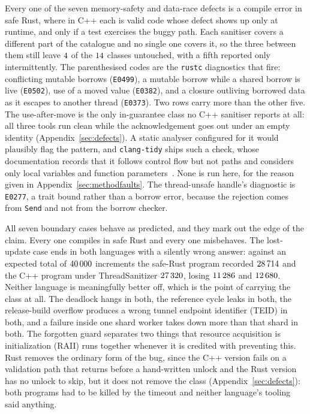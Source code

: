 \documentclass[english,oneside,a4paper,censored,csm,software-track-2020]{HYthesisML}
\begin{document}
Every one of the seven memory-safety and data-race defects is a compile error in safe Rust, where
in C++ each is valid code whose defect shows up only at runtime, and only if a test exercises the
buggy path. Each sanitiser covers a different part of the catalogue and no single one covers it,
so the three between them still leave $4$ of the $14$ classes
untouched, with a fifth reported only intermittently. The parenthesised codes are the
\texttt{rustc} diagnostics that fire: conflicting mutable borrows (\texttt{E0499}), a mutable
borrow while a shared borrow is live (\texttt{E0502}), use of a moved value (\texttt{E0382}), and
a closure outliving borrowed data as it escapes to another thread (\texttt{E0373}). Two rows carry
more than the other five. The use-after-move is the only in-guarantee class no C++ sanitiser
reports at all: all three tools run clean while the acknowledgement goes out under an empty
identity (Appendix~\ref{sec:defects}). A static analyser configured for it would plausibly flag the
pattern, and \texttt{clang-tidy} ships such a check, whose documentation records that it follows
control flow but not paths and considers only local variables and function
parameters~\cite{clangtidyuseaftermove}. None is run here, for the reason given in
Appendix~\ref{sec:methodfaults}. The thread-unsafe handle's diagnostic is \texttt{E0277}, a trait
bound rather than a borrow error, because the rejection comes from \texttt{Send} and not from the
borrow checker.

All seven boundary cases behave as predicted, and they mark out the edge of the claim. Every one
compiles in safe Rust and every one misbehaves. The lost-update case ends in both languages with
a silently wrong answer: against an expected total of $40\,000$ increments the
safe-Rust program recorded $28\,714$ and the C++ program under ThreadSanitizer
$27\,320$, losing $11\,286$ and $12\,680$. Neither language
is meaningfully better off, which is the point of carrying the class at all. The deadlock hangs
in both, the reference cycle leaks in both, the release-build overflow produces a wrong tunnel
endpoint identifier (TEID) in both, and a failure inside one shard worker takes down more than
that shard in both. The forgotten guard separates two things that resource acquisition is
initialization (RAII) runs together whenever it is credited with preventing this. Rust removes the
ordinary form of the bug, since the C++ version fails on a validation path that returns before a
hand-written unlock and the Rust version has no unlock to skip, but it does not remove the class
(Appendix~\ref{sec:defects}): both programs had to be killed by the timeout and neither language's
tooling said anything.
\end{document}
